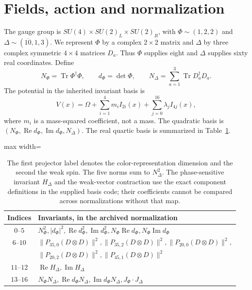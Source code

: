\documentclass[11pt]{article}
\newcommand{\Tr}{\operatorname{Tr}}
\newcommand{\Rea}{\operatorname{Re}}
\newcommand{\Ima}{\operatorname{Im}}
\begin{document}
\section{Fields, action and normalization}
The gauge group is
$SU(4)\times SU(2)_L\times SU(2)_R$, with
$\Phi\sim(1,2,2)$ and $\Delta\sim(\overline{10},1,3)$.
We represent $\Phi$ by a complex $2\times2$ matrix and $\Delta$ by three
complex symmetric $4\times4$ matrices $D_a$. Thus $\Phi$ supplies eight
and $\Delta$ supplies sixty real coordinates. Define
\begin{equation}
 N_\Phi=\Tr\Phi^\dagger\Phi,\qquad d_\Phi=\det\Phi,
 \qquad N_\Delta=\sum_{a=1}^3\Tr D_a^\dagger D_a.
\end{equation}
The potential in the inherited invariant basis is
\begin{equation}\label{eq:potential}
 V(x)=\Omega+\sum_{i=1}^4m_i I_{2i}(x)
             +\sum_{j=0}^{16}\lambda_j I_{4j}(x),
\end{equation}
where $m_i$ is a mass-squared coefficient, not a mass. The quadratic basis is
$(N_\Phi,\Rea d_\Phi,\Ima d_\Phi,N_\Delta)$.
The real quartic basis is summarized in Table~\ref{tab:basis}.

\begin{table}[ht]
\centering\small
\begin{adjustbox}{max width=\linewidth}\begin{tabular}{cl}
\toprule
Indices & Invariants, in the archived normalization\\
\midrule
$0$--$5$ & $N_\Phi^2, |d_\Phi|^2,\Rea d_\Phi^2,\Ima d_\Phi^2,
 N_\Phi\Rea d_\Phi,N_\Phi\Ima d_\Phi$\\
$6$--$10$ & $\|P_{35,0}(D\otimes D)\|^2,\|P_{35,2}(D\otimes D)\|^2,
 \|P_{20,0}(D\otimes D)\|^2,$\\
 & $\|P_{20,2}(D\otimes D)\|^2,\|P_{45,1}(D\otimes D)\|^2$\\
$11$--$12$ & $\Rea H_\Delta,\Ima H_\Delta$\\
$13$--$16$ & $N_\Phi N_\Delta,\Rea d_\Phi N_\Delta,
 \Ima d_\Phi N_\Delta,J_\Phi\cdot J_\Delta$\\
\bottomrule
\end{tabular}\end{adjustbox}
\caption{The first projector label denotes the color-representation
dimension and the second the weak spin. The five norms sum to
$N_\Delta^2$. The phase-sensitive invariant $H_\Delta$ and the weak-vector
contraction use the exact component definitions in the supplied basis code;
their coefficients cannot be compared across normalizations without that map.}
\label{tab:basis}
\end{table}
\end{document}
